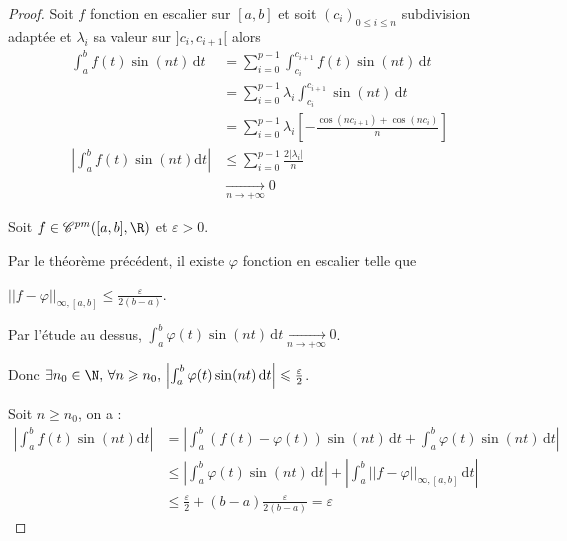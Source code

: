 
\begin{proof}
    Soit $f$ fonction en escalier sur $[a, b]$ et soit $(c_i)_{0 \leqslant i \leqslant n}$ 
    subdivision adaptée et $\lambda_i$ sa valeur sur $]c_i, c_{i + 1}[$ alors 
    \begin{align}
        \int_{a }^{b } f(t) \sin(nt) \,\mathrm{d}t & = \sum_{i = 0}^{p - 1} \int_{c_i}^{c_{i + 1}} f(t) \sin(nt) \,\mathrm{d}t \\
        & = \sum_{i = 0}^{p - 1} \lambda_i \int_{c_i}^{c_{i + 1}} \sin(nt) \,\mathrm{d}t \\
        & = \sum_{i = 0}^{p - 1} \lambda_i \left[ - \frac{\cos(nc_{i + 1}) + \cos(nc_i)}{n} \right] \\
        \left| \int_{a }^{b } f(t) \sin(nt) \mathrm d t  \right| & \leqslant \sum_{i = 0 }^{p - 1} \frac{2 |\lambda_i|}{n} \\
        & \xrightarrow[n \to + \infty ]{} 0
    \end{align}

    Soit $f \in \mathscr C^{pm}([a, b], \R)$ et $\varepsilon > 0$.

    Par le théorème précédent, il existe $\varphi$ fonction en escalier telle que 
    
    $||f - \varphi||_{\infty, [a, b]} \leqslant \frac \varepsilon {2 (b - a)}$.

    Par l'étude au dessus, $\int_{a }^{b } \varphi(t) \sin(nt) \,\mathrm{d}t \xrightarrow[n \to + \infty ]{} 0$.

    Donc $\exists n_0 \in \N, \, \forall n \geqslant n_0, \, \left| \int_{a }^{b } \varphi(t) \sin(nt) \,\mathrm{d}t \right| \leqslant \frac \varepsilon 2$.

    Soit $n \geqslant n_0$, on a :
    \begin{align}
        \left| \int_a^b f(t) \sin(nt) \mathrm d t  \right| & = \left| \int_a^b (f(t) - \varphi(t)) \sin(nt) \,\mathrm{d}t + \int_a^b \varphi(t) \sin(nt) \,\mathrm{d}t \right| \\
        & \leqslant \left| \int_a^b \varphi(t) \sin(nt) \,\mathrm{d}t \right| + \left| \int_a^b ||f - \varphi||_{\infty, [a, b]} \,\mathrm{d}t \right| \\
        & \leqslant \frac \varepsilon 2 + (b - a) \frac \varepsilon {2 (b - a)} = \varepsilon
    \end{align}

\end{proof}

